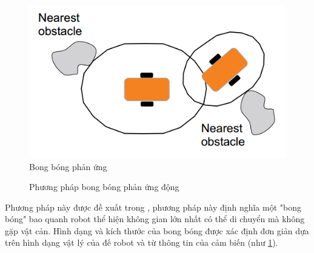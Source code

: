 \begin{figure}[htbp]
  \centering
  \includegraphics[width=0.6\linewidth]{figures/bubble-band.png}
  \caption{Bong bóng phản ứng \cite{Susnea2009}}
  \label{fig:bubble-band}
\end{figure}

\begin{figure}
	\centering
	\hspace{8pt}
	\caption{Phương pháp bong bóng phản ứng động}
	\label{fig:bubbleRebound}
\end{figure}

Phương pháp này được đề xuất trong \cite{Quinlan1993}, phương pháp này định nghĩa một "bong bóng" bao quanh robot thể hiện không gian lớn nhất có thể di chuyển mà không gặp vật cản. Hình dạng và kích thước của bong bóng được xác định đơn giản dựa trên hình dạng vật lý của đế robot và từ thông tin của cảm biến (như \figurename{ \ref{fig:bubble-band}}).

